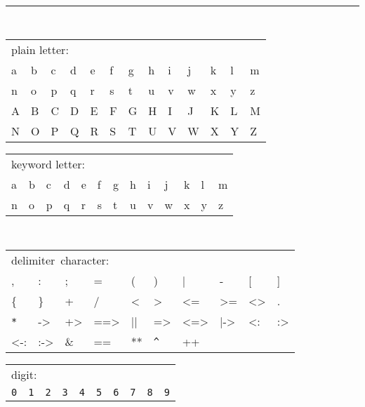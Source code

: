 \documentclass[\pformat,12pt]{article}
\begin{document}
\begin{table}[ht]
\setlength{\tabcolsep}{3.5mm}
\setlength{\arraycolsep}{3.5mm}

\rule{\textwidth}{.5mm}
    {\tt
    \begin{tabular}{*{13}{l}} 
        \multicolumn{13}{l}{\rm plain letter:} \\
        a & b & c & d & e & f & g & h & i & j & k & l & m \\
        n & o & p & q & r & s & t & u & v & w & x & y & z \\
        A & B & C & D & E & F & G & H & I & J & K & L & M \\
        N & O & P & Q & R & S & T & U & V & W & X & Y & Z
    \end{tabular}
    }

\blankline
    {\sf  
    \begin{tabular}{*{13}{l}}
        \multicolumn{13}{l}{\rm keyword letter:} \\
        a & b & c & d & e & f & g & h & i & j & k & l & m \\
        n & o & p & q & r & s & t & u & v & w & x & y & z
    \end{tabular}
    }

\blankline
{\tt
    \begin{tabular}{*{10}{l}}
        \multicolumn{10}{l}{\mbox{{\rm delimiter character:}}} \\
          ,         & :         & ;         & =         & (         &
          )         & |         & -         & [         & ]         \\
          \{        & \}        & +         & /         & <         &
          >         & <=        & >=        & <>        &  .        \\
          \verb+*+  & ->        & +>        & ==>       & ||        &
          =>        &   <=>     & |->       & <:        & :>        \\
          <-:       & :->       & \&        & ==        & **        & 
          \verb+^+  & ++        &           &           &           \\
    \end{tabular}
}

\blankline
    \begin{tabular}{*{10}{l}}
        \multicolumn{10}{l}{digit:} \\
        {\tt 0}
        & {\tt 1} 
        & {\tt 2} 
        & {\tt 3} 
        & {\tt 4} 
        & {\tt 5}
        & {\tt 6} 
        & {\tt 7} 
        & {\tt 8} 
        & {\tt 9} 
     \end{tabular}


\end{table}
\end{document}
